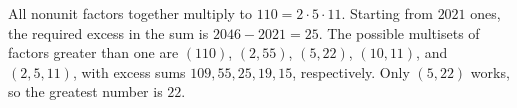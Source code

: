 All nonunit factors together multiply to $110=2\cdot5\cdot11$. Starting from $2021$ ones, the required excess in the sum is $2046-2021=25$. The possible multisets of factors greater than one are $(110)$, $(2,55)$, $(5,22)$, $(10,11)$, and $(2,5,11)$, with excess sums $109,55,25,19,15$, respectively. Only $(5,22)$ works, so the greatest number is $\boxed{22}$.
